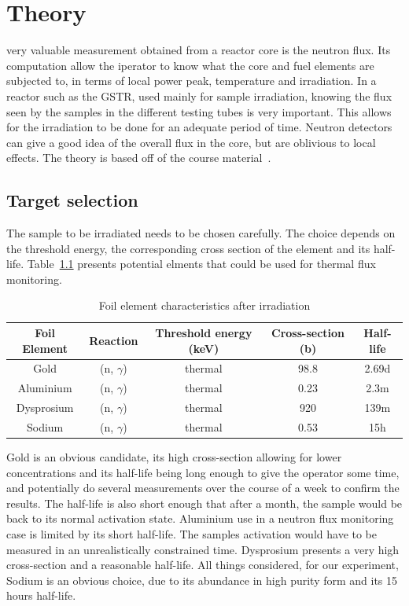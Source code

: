 %
%
\let\textcircled=\pgftextcircled
\chapter{Theory}
\label{chap:intro}

 very valuable measurement obtained from a reactor core is the neutron flux. Its computation allow the iperator to know what the core and fuel elements are subjected to, in terms of local power peak, temperature and irradiation. In a reactor such as the GSTR, used mainly for sample irradiation, knowing the flux seen by the samples in the different testing tubes is very important. This allows for the irradiation to be done for an adequate period of time. Neutron detectors can give a good idea of the overall flux in the core, but are oblivious to local effects. The theory is based off of the course material~\cite{debey01}.

\section{Target selection}

The sample to be irradiated needs to be chosen carefully. The choice depends on the threshold energy, the corresponding cross section of the element and its half-life. Table~\ref{tab:target} presents potential elments that could be used for thermal flux monitoring.

\begin{table}[t]
\centering
\caption{Foil element characteristics after irradiation}
\label{tab:target}
\begin{tabular}{|c|c|c|c|c|}
\hline
Foil Element & Reaction      & Threshold energy (keV) & Cross-section (b) & Half-life \\ \hline\hline
Gold         & (n, $\gamma$) & thermal                & 98.8              & 2.69d     \\ \hline
Aluminium    & (n, $\gamma$) & thermal                & 0.23              & 2.3m      \\ \hline
Dysprosium   & (n, $\gamma$) & thermal                & 920               & 139m      \\ \hline
Sodium       & (n, $\gamma$) & thermal                & 0.53              & 15h       \\ \hline
\end{tabular}
\end{table}

Gold is an obvious candidate, its high cross-section allowing for lower concentrations and its half-life being long enough to give the operator some time, and potentially do several measurements over the course of a week to confirm the results. The half-life is also short enough that after a month, the sample would be back to its normal activation state. Aluminium use in a neutron flux monitoring case is limited by its short half-life. The samples activation would have to be measured in an unrealistically constrained time. Dysprosium presents a very high cross-section and a reasonable half-life. All things considered, for our experiment, Sodium is an obvious choice, due to its abundance in high purity form and its 15 hours half-life.

